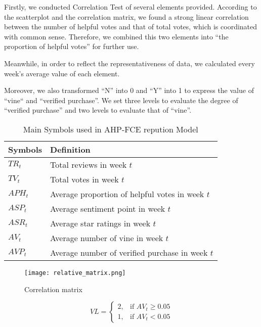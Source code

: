 \documentclass{mcmthesis}
\begin{document}
Firstly, we conducted Correlation Test of several elements provided. According to the scatterplot and the correlation matrix, we found a strong linear correlation between the number of helpful votes and that of total votes, which is coordinated with common sense. Therefore, we combined this two elements into “the proportion of helpful votes” for further use. 

Meanwhile, in order to reflect the representativeness of data, we calculated every week’s average value of each element. 

Moreover, we also transformed “N” into 0 and “Y” into 1 to express the value of “vine“ and “verified purchase”. We set three levels to evaluate the degree of “verified purchase” and two levels to evaluate that of “vine”. 

\begin{table}[!h]
  \centering
  \caption{Main Symbols used in AHP-FCE repution Model} %
  \begin{tabular}{ll}
  \toprule[2.5pt]
  \textbf{Symbols}& \textbf{Definition} \\
  \midrule[1.5pt]
   $TR_t$ & Total reviews in week $t$ \\
   \midrule 
   $TV_t$ & Total votes in week $t$ \\
   \midrule 
   $APH_t$ & Average proportion of helpful votes in week $t$ \\
    \midrule 
    $ASP_t$ & Average sentiment point in week $t$ \\
    \midrule 
    $ASR_t$ & Average star ratings in week $t$ \\
    \midrule 
    $AV_t$ & Average number of vine in week $t$ \\ 
    \midrule 
    $AVP_t$ & Average number of verified purchase in week $t$ \\
  \bottomrule
  \end{tabular}
  \end{table}


  \begin{figure}[!h]
    \small
    \centering
    \texttt{[image: relative\_matrix.png]}
    \caption{Correlation matrix} %
  \end{figure}

  \begin{equation}
    VL = \begin{cases}
      2, & \text{if } AV_t \ge 0.05 \\
      1, & \text{if } AV_t < 0.05
    \end{cases}
  \end{equation}
\end{document}
